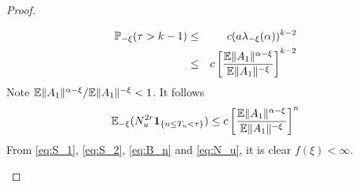 \documentclass{article}
\theoremstyle{remark}
\begin{document}
\begin{proof}
\begin{enumerate}
\begin{enumerate}
\begin{eqnarray*}
        \mathbb{P}_{-\xi}(\tau > k-1) &\leq&
        c (a \lambda_{-\xi}(\alpha))^{k-2} \\
        &\leq& c \left[
          {
            \mathbb{E}\|A_1\|^{\alpha - \xi}
            \over
            \mathbb{E}\|A_1\|^{-\xi}
          }
          \right]^{k-2}
      \end{eqnarray*}
      Note $\mathbb{E}\|A_1\|^{\alpha - \xi}/\mathbb{E}\|A_1\|^{-\xi} < 1$.
      It follows
      \begin{equation}
        \label{eq:N_u}
        \mathbb{E}_{-\xi}(N_u^{2r}\mathbf{1}_{\{n \leq T_u < \tau\}}) \leq
        c \left[
          {
            \mathbb{E}\|A_1\|^{\alpha - \xi}
            \over
            \mathbb{E}\|A_1\|^{-\xi}
          }
          \right]^{n}
      \end{equation}
      From \eqref{eq:S_1}, \eqref{eq:S_2}, \eqref{eq:B_n} and
      \eqref{eq:N_u}, it is clear $f(\xi) < \infty$.
      

\end{enumerate}
\end{enumerate}
\end{proof}
\end{document}
